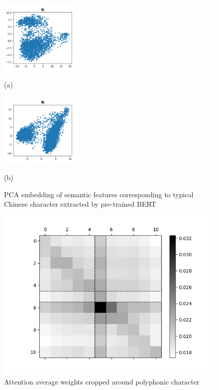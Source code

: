 \documentclass[a4paper]{article}
\begin{document}
\begin{figure}[t]
	\begin{minipage}[b]{.48\linewidth}
		\centering
		\centerline{\includegraphics[width=4cm]{pics/zhang1.png}}
		\centerline{(a)  }\medskip
	\end{minipage}
	\hfill
	\begin{minipage}[b]{0.48\linewidth}
		\centering
		\centerline{\includegraphics[width=4cm]{pics/di1.png}}
		\centerline{(b)}\medskip
	\end{minipage}
	
	\caption{PCA embedding of semantic features corresponding to typical Chinese character extracted by pre-trained BERT }
	\label{fig:pca}
\end{figure}

\begin{figure}[t]
	\centering
	\includegraphics[scale=0.35]{pics/attensep.png}
	\caption{Attention average weights cropped around polyphonic character}
	\label{fig:attenmap}
\end{figure}
\end{document}
